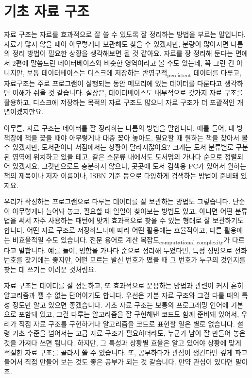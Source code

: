 \documentclass[11pt,a4paper]{article}
\newcommand{\sub}[1]{\textsubscript{#1}}
\begin{document}
\section{기초 자료 구조}

자료 구조는 자료를 효과적으로 잘 쓸 수 있도록 잘 정리하는 방법을 부르는 말입니다. 자료가 많지 않을 때야 아무렇게나 보관해도 찾을 수 있겠지만, 분량이 많아지면 나름의 정리 방법이 필요한 상황을 생각해보면 될 것 같아요. 자료를 장 정리해 둔다는 면에서 2편에 말씀드린 \textsf{데이터베이스}와 비슷한 영역이라고 볼 수도 있는데, 꼭 그런 건 아니지만, 보통 데이터베이스는 디스크에 저장하는 반영구적\sub{persistent} 데이터를 다루고, 자료구조는 주로 프로그램이 실행되는 동안 메모리에 있는 데이터를 다룬다고 생각하면 이해가 쉬울 것 같습니다. 실상은, 데이터베이스도 내부적으로 갖가지 자료 구조를 활용하고, 디스크에 저장하는 목적의 자료 구조도 많으니 자료 구조가 더 포괄적인 개념이겠지만요.

아무튼, 자료 구조는 데이터를 잘 정리하는 나름의 방법을 말합니다. 예를 들어, 내 방 책장에 책을 꽂을 때야 아무렇게나 대충 꽂아 놓아도, 필요할 때 원하는 책을 찾아서 볼 수 있겠지만, 도서관이나 서점에서는 상황이 달라지잖아요? 크게는 도서 분류별로 구분된 영역에 위치하고 있을 테고, 같은 소분류 내에서도 도서명의 가나다 순으로 정렬되어 있겠지요. 그것만으로도 충분하지 않으니, 곳곳에 도서 검색용 PC가 있어서 원하는 책의 제목이나 저자 이름이나, ISBN 기준 등으로 다양하게 검색하는 방법이 준비돼 있지요.

우리가 작성하는 프로그램으로 다루는 데이터를 잘 보관하는 방법도 그렇습니다. 단순이 아무렇게나 늘어놔 놓고, 필요할 때 일일이 찾아보는 방법도 있고, 아니면 어떤 분류법을 써서 자주 사용하는 패턴에 맞게 효과적으로 찾을 수 있는 형태로 잘 보관하기도 합니다. 어떤 자료 구조로 저장하느냐에 따라 어떤 활용에는 효율적이고, 다른 활용에는 비효율적일 수도 있습니다. 전문 용어로 계산 복잡도\sub{computational complexity}가 다르다고 말합니다. 예를 들어, 명함을 가나다 순으로 정리해 두었다면, 특정 성명으로 전화번호를 찾기에는 좋지만, 어떤 모르는 발신 번호가 떴을 때 그 번호가 누구의 것인지를 찾는 데 쓰기는 어려운 것처럼요.

자료 구조는 데이터를 잘 정돈하고, 또 효과적으로 운용하는 방법과 관련이 커서 흔히 알고리즘과 뗄 수 없는 단어이기도 합니다. 우선은 기본 자료 구조와 그걸 다룰 때의 특성 정도만 알고 있으면 좋겠습니다. 기초 자료 구조는 보통의 프로그래밍 언어에 기본으로 포함돼 있고, 그걸 다루는 알고리즘을 잘 구현해낸 코드도 함께 준비돼 있어서, 우리가 직접 자료 구조를 구현하거나 알고리즘을 코드로 표현할 일은 별로 없습니다. 설령 기초 수준을 넘어서는 고급 자료 구조가 필요하더라도, 누군가 남이 잘 만들어 놓은 것을 가져다 쓰면 됩니다. 하지만, 그 특성과 상황별 효율은 알고 있어야 상황에 맞게 적절한 자료 구조를 골라서 쓸 수 있습니다. 또, 공부하다가 관심이 생긴다면 깊게 파고들어서 직접 만들어 보는 것도 좋은 공부가 되는 것 같습니다. 만약 관심이 있다면 말이죠.
\end{document}
